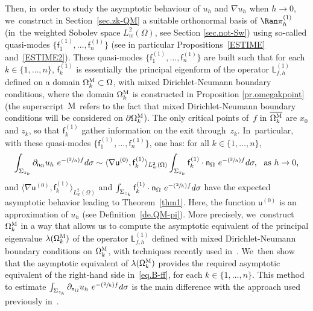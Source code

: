 \documentclass[10pt]{amsart}
\newcommand{\Psfrac}[2]{(\sfrac{#1}{#2})}
\let\ts\textstyle
\theoremstyle{plain}
\theoremstyle{definition}
\begin{document}
Then, in~order to study the asymptotic behaviour of $u_h$ and
$\nabla u_h$ when $h\to 0$, we~construct in Section~\ref{sec.zk-QM} a suitable
orthonormal basis of $\Ran \pi_h^{(1)} $ (in~the weighted Sobolev space $L^2_w(\Omega)$, see Section \ref{sec.not-Sw}) using so-called
quasi-modes $\{\mathsf f_1^{(1)}, \ldots, \mathsf f_n^{(1)}\} $ (see
in particular
Propositions~\ref{ESTIME} and~\ref{ESTIME2}). These quasi-modes $\{\mathsf f_1^{(1)}, \ldots, \mathsf
f_n^{(1)}\} $ are built such that for each $k\in \{1,\ldots,n\}$,
$\mathsf f_k^{(1)} $ is essentially the principal eigenform of the
operator $\mathsf L^{(1)}_{f,h}$ defined on a domain
$\Omega_k^{\textsc{M}} \subset \Omega$,
with mixed Dirichlet-Neumann boundary conditions, where the domain $\Omega_k^{\textsc{M}}$ is constructed in Proposition \ref{pr.omegakpoint} (the superscript~${\textsc{M}}$ refers to the fact that mixed Dirichlet-Neumann
boundary conditions will be considered on $\partial
\Omega_k^{\textsc{M}}$). The only critical points of~$f$ in
$\overline{\Omega_k^{\textsc{M}}}$ are $x_0$ and $z_k$, so that
$\mathsf f_k^{(1)}$ gather information on the exit through~$z_k$. In~particular, with these quasi-modes $\{\mathsf f_1^{(1)}, \ldots,
\mathsf f_n^{(1)}\} $, one has: for all $k\in \{1,\ldots,n\}$,\vspace*{-3pt}
\begin{equation}\label{eq.B-ff}
\int_{\Sigma_{z_k}} \partial_{\mathsf n_\Omega}
u_h \ e^{-\Psfrac{2}{h} f} d\sigma
\sim \langle \nabla \mathsf u^{(0)}, \mathsf f_k^{(1)} \rangle_{L^2_w(\Omega)} \int_{\Sigma_{z_k}} \mathsf f_k^{(1)} \cdot \mathsf n_\Omega \ e^{-\Psfrac{2}{h} f} d\sigma, \ \text{ as $\ts h\to 0$,}
\end{equation}
and $\langle \nabla \mathsf u^{(0)}, \mathsf f_k^{(1)} \rangle_{L^2_w(\Omega)}$ and $\int_{\Sigma_{z_k}} \mathsf f_k^{(1)} \cdot \mathsf
n_\Omega \ e^{-\Psfrac{2}{h} f} d\sigma$ have the expected
asymptotic behavior leading to Theorem~\ref{thm1}. Here, the function $\mathsf u^{(0)}$ is an approximation of $u_h$ (see Definition~\ref{de.QM-pi}). More precisely, we~construct $\Omega_k^{\textsc{M}}$ in a way that allows us to \hbox{compute} the asymptotic equivalent of the principal eigenvalue $\lambda(\mathsf
\Omega_k^{\textsc{M}})$ of the operator $\mathsf L^{(1)}_{f,h}$ defined with mixed Dirichlet-Neumann boundary conditions on
$\Omega_k^{\textsc{M}}$, with techniques recently used in~\cite{DoNe2}. We~then show that the asymptotic equivalent of $\lambda(\mathsf
\Omega_k^{\textsc{M}})$ provides the required asymptotic equivalent
of the right-hand side in~\eqref{eq.B-ff}, for each $k\in
\{1,\ldots,n\}$. This method to estimate $\int_{\Sigma_{z_k}} \partial_{\mathsf n_\Omega}
u_h \ e^{-\Psfrac{2}{h} f} d\sigma$
is the main difference with
the approach used previously in~\cite{DLLN}.
\end{document}
